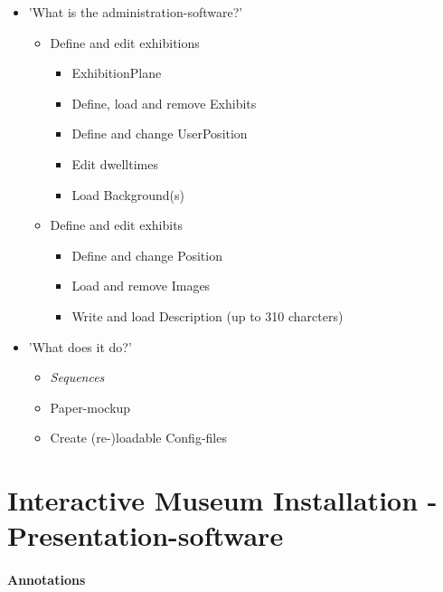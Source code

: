 \begin{itemize}
	\item 'What is the administration-software?'
	\begin{itemize}
		\item Define and edit exhibitions
		\begin{itemize}
			\item ExhibitionPlane
			\item Define, load and remove Exhibits
			\item Define and change UserPosition
			\item Edit dwelltimes
			\item Load Background(s)
		\end{itemize}
		\item Define and edit exhibits
		\begin{itemize}
			\item Define and change Position
			\item Load and remove Images
			\item Write and load Description (up to 310 charcters)
		\end{itemize}
	\end{itemize}
	\item 'What does it do?'
	\begin{itemize}
		\item \textit{Sequences}
		\item Paper-mockup
		\item Create (re-)loadable Config-files
	\end{itemize}
\end{itemize}



\section{Interactive Museum Installation - Presentation-software}
\label{implementation_presentation}

\paragraph{Annotations}

